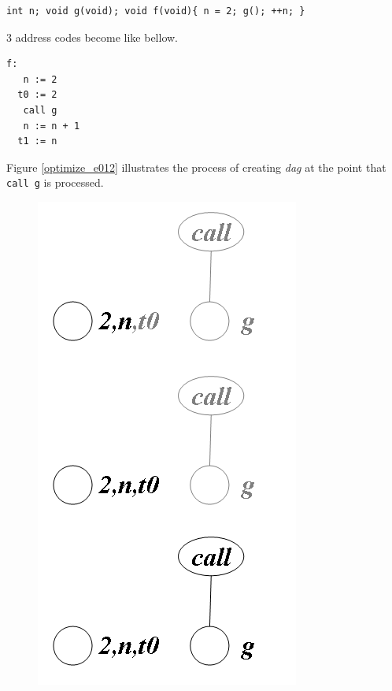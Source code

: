 \begin{Example}
\label{optimize_e011}
\begin{verbatim}
int n; void g(void); void f(void){ n = 2; g(); ++n; }
\end{verbatim}
3 address codes become like bellow.
\begin{verbatim}
f:
   n := 2
  t0 := 2
   call g
   n := n + 1
  t1 := n
\end{verbatim}
Figure \ref{optimize_e012} illustrates the process of creating
{\em dag} at the point that {\tt{call g}} is processed.

\begin{figure}[htbp]
\begin{center}
\begin{htmlonly}
\includegraphics[width=0.530\linewidth,height=1.0\linewidth]{opt003.png}
\end{htmlonly}
\begin{latexonly}

\end{latexonly}
\end{center}
\end{figure}
\end{Example}
